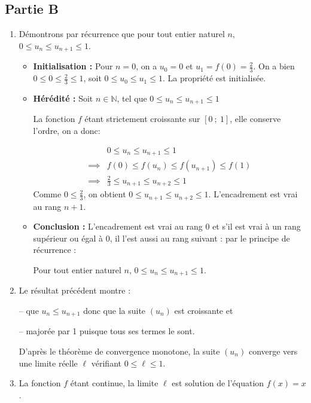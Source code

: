 \documentclass[10pt]{article}
\providecommand{\N}{\mathbb{N}}
\begin{document}
\subsection*{Partie B}
\begin{enumerate}
\item Démontrons par récurrence que pour tout entier naturel $n$, $0 \leqslant u_n \leqslant u_{n+1} \leqslant 1$.
\begin{itemize}
\item \textbf{Initialisation :} Pour $n = 0$, on a $u_0 = 0$ et $u_1 = f(0) = \frac{2}{3}$. On a bien $0 \leqslant 0 \leqslant \frac{2}{3} \leqslant 1$, soit $0 \leqslant u_0 \leqslant u_1 \leqslant 1$. La propriété est initialisée.
\item \textbf{Hérédité :} Soit $n \in \N$, tel que $0 \leqslant u_n \leqslant u_{n+1} \leqslant 1$

La fonction $f$ étant strictement croissante sur $[0~;~1]$, elle conserve l'ordre, on a donc:

\[\begin{array}{rl}
& 0 \leqslant u_n \leqslant u_{n+1} \leqslant 1 \\
\implies & f(0) \leqslant f(u_n) \leqslant f(u_{n+1}) \leqslant f(1) \\
\implies & \frac{2}{3} \leqslant u_{n+1} \leqslant u_{n+2} \leqslant 1
\end{array}
\]
Comme $0 \leqslant \frac{2}{3}$, on obtient $0 \leqslant u_{n+1} \leqslant u_{n+2} \leqslant 1$. L'encadrement est vrai au rang $n + 1$.
\item \textbf{Conclusion :} L'encadrement est vrai au rang 0 et s'il est vrai à un rang supérieur ou égal à 0, il l'est aussi au rang suivant : par le principe de récurrence :

Pour tout entier naturel $n$, $0 \leqslant u_n \leqslant u_{n+1} \leqslant 1$.
\end{itemize}

\item Le résultat précédent montre :

-- que $u_n \leqslant u_{n+1}$ donc que la suite $(u_n)$ est croissante et 

-- majorée par 1 puisque tous ses termes le sont.

D'après le théorème de convergence monotone, la suite $(u_n)$ converge vers une limite réelle $\ell$ vérifiant $0 \leqslant \ell \leqslant 1$.

\item La fonction $f$ étant continue, la limite $\ell$ est solution de l'équation $f(x) = x$.


\end{enumerate}
\end{document}

